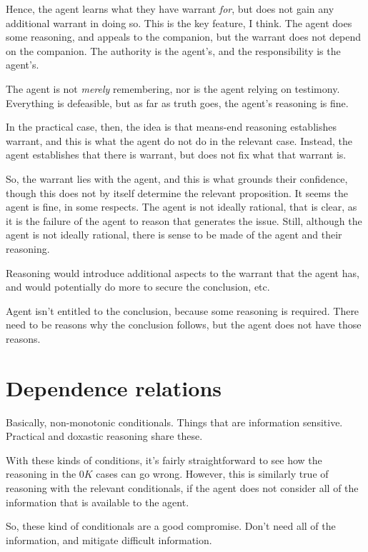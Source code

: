 \documentclass[10pt]{article}
\begin{document}
Hence, the agent learns what they have warrant \emph{for}, but does not gain any additional warrant in doing so.
This is the key feature, I think.
The agent does some reasoning, and appeals to the companion, but the warrant does not depend on the companion.
The authority is the agent's, and the responsibility is the agent's.

The agent is not \emph{merely} remembering, nor is the agent relying on testimony.
Everything is defeasible, but as far as truth goes, the agent's reasoning is fine.

In the practical case, then, the idea is that means-end reasoning establishes warrant, and this is what the agent do not do in the relevant case.
Instead, the agent establishes that there is warrant, but does not fix what that warrant is.

So, the warrant lies with the agent, and this is what grounds their confidence, though this does not by itself determine the relevant proposition.
It seems the agent is fine, in some respects.
The agent is not ideally rational, that is clear, as it is the failure of the agent to reason that generates the issue.
Still, although the agent is not ideally rational, there is sense to be made of the agent and their reasoning.

Reasoning would introduce additional aspects to the warrant that the agent has, and would potentially do more to secure the conclusion, etc.

Agent isn't entitled to the conclusion, because some reasoning is required.
There need to be reasons why the conclusion follows, but the agent does not have those reasons.

\newpage

\section{Dependence relations}
\label{sec:dependence-relations}

Basically, non-monotonic conditionals.
Things that are information sensitive.
Practical and doxastic reasoning share these.

With these kinds of conditions, it's fairly straightforward to see how the reasoning in the \(0K\) cases can go wrong.
However, this is similarly true of reasoning with the relevant conditionals, if the agent does not consider all of the information that is available to the agent.

So, these kind of conditionals are a good compromise.
Don't need all of the information, and mitigate difficult information.
\end{document}
